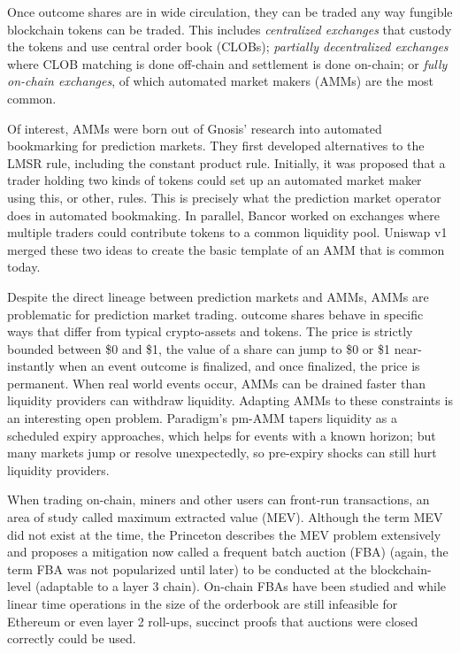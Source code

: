 Once outcome shares are in wide circulation, they can be traded any way fungible blockchain tokens can be traded. This includes \textit{centralized exchanges} that custody the tokens and use central order book (CLOBs); \textit{partially decentralized exchanges} where CLOB matching is done off-chain and settlement is done on-chain; or \textit{fully on-chain exchanges}, of which automated market makers (AMMs) are the most common. 

Of interest, AMMs were born out of Gnosis' research into automated bookmarking for prediction markets. They first developed alternatives to the LMSR rule, including the constant product rule. Initially, it was proposed that a trader holding two kinds of tokens could set up an automated market maker using this, or other, rules. This is precisely what the prediction market operator does in automated bookmaking. In parallel, Bancor worked on exchanges where multiple traders could contribute tokens to a common liquidity pool. Uniswap v1 merged these two ideas to create the basic template of an AMM that is common today.

Despite the direct lineage between prediction markets and AMMs, AMMs are problematic for prediction market trading. \depm outcome shares behave in specific ways that differ from typical crypto-assets and tokens. The price is strictly bounded between \$0 and \$1, the value of a share can jump to \$0 or \$1 near-instantly when an event outcome is finalized, and once finalized, the price is permanent. When real world events occur, AMMs can be drained faster than liquidity providers can withdraw liquidity. Adapting AMMs to these constraints is an interesting open problem. Paradigm’s pm-AMM tapers liquidity as a scheduled expiry approaches, which helps for events with a known horizon; but many markets jump or resolve unexpectedly, so pre-expiry shocks can still hurt liquidity providers.

When trading on-chain, miners and other users can front-run transactions, an area of study called maximum extracted value (MEV). Although the term MEV did not exist at the time, the Princeton \depm describes the MEV problem extensively and proposes a mitigation now called a frequent batch auction (FBA) (again, the term FBA was not popularized until later) to be conducted at the blockchain-level (adaptable to a layer 3 chain). On-chain FBAs have been studied and while linear time operations in the size of the orderbook are still infeasible for Ethereum or even layer 2 roll-ups, succinct proofs that auctions were closed correctly could be used.  

